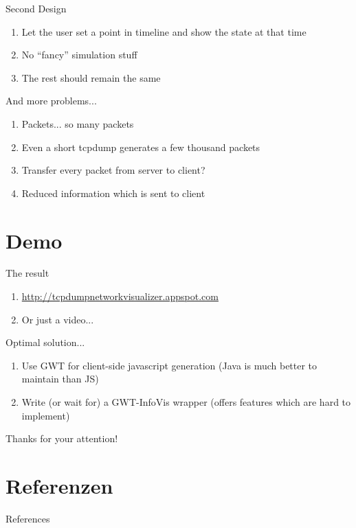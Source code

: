 \documentclass{beamer}
\begin{document}
\begin{frame}{Second Design}
 \begin{enumerate}
  \item Let the user set a point in timeline and show the state at that time
  \item No ``fancy'' simulation stuff
  \item The rest should remain the same
 \end{enumerate}

\end{frame}


\begin{frame}{And more problems...}
 \begin{enumerate}
  \item Packets... so many packets
  \item Even a short tcpdump generates a few thousand packets
  \item Transfer every packet from server to client?
  \item Reduced information which is sent to client
 \end{enumerate}
\end{frame}

\section{Demo}

\begin{frame}{The result}
\begin{enumerate}
 \item \url{http://tcpdumpnetworkvisualizer.appspot.com}
 \item Or just a video...
\end{enumerate}
\end{frame}

\begin{frame}{Optimal solution...}
\begin{enumerate}
 \item Use GWT for client-side javascript generation (Java is much better to maintain than JS)
 \item Write (or wait for) a GWT-InfoVis wrapper (offers features which are hard to implement)
\end{enumerate}
\end{frame}


\begin{frame}
  Thanks for your attention!
\end{frame}


\section{Referenzen}

\begin{frame}{References}
\printbibliography
\end{frame}
\end{document}
